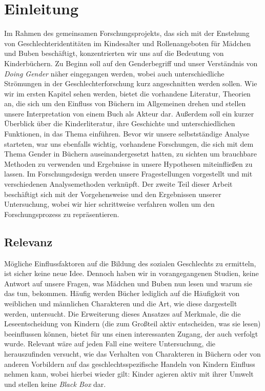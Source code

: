 \onehalfspace

\chapter{Einleitung}

Im Rahmen des gemeinsamen Forschungsprojekts, das sich mit der Enstehung
von Geschlechteridentitäten im Kindesalter und Rollenangeboten für
Mädchen und Buben beschäftigt, konzentrierten wir uns auf die Bedeutung
von Kinderbüchern. Zu Beginn soll auf den Genderbegriff und unser
Verständnis von \emph{Doing Gender} näher eingegangen werden, wobei auch
unterschiedliche Strömungen in der Geschlechterforschung kurz
angeschnitten werden sollen. Wie wir im ersten Kapitel sehen werden,
bietet die vorhandene Literatur, Theorien an, die sich um den Einfluss
von Büchern im Allgemeinen drehen und stellen unsere Interpretation von
einem Buch als Akteur dar. Außerdem soll ein kurzer Überblick über die
Kinderliteratur, ihre Geschichte und unterschiedlichen Funktionen, in
das Thema einführen. Bevor wir unsere selbstständige Analyse starteten,
war uns ebenfalls wichtig, vorhandene Forschungen, die sich mit dem
Thema Gender in Büchern auseinandergesetzt hatten, zu sichten um
brauchbare Methoden zu verwenden und Ergebnisse in unsere Hypothesen
miteinfließen zu lassen. Im Forschungsdesign werden unsere
Fragestellungen vorgestellt und mit verschiedenen Analysemethoden
verknüpft. Der zweite Teil dieser Arbeit beschäftigt sich mit der
Vorgehensweise und den Ergebnissen unserer Untersuchung, wobei wir hier
schrittweise verfahren wollen um den Forschungsprozess zu
repräsentieren.

\section{Relevanz}

Mögliche Einflussfaktoren auf die Bildung des sozialen Geschlechts zu
ermitteln, ist sicher keine neue Idee. Dennoch haben wir in
vorangegangenen Studien, keine Antwort auf unsere Fragen, was Mädchen
und Buben nun lesen und warum sie das tun, bekommen. Häufig werden
Bücher lediglich auf die Häufigkeit von weiblichen und männlichen
Charakteren und die Art, wie diese dargestellt werden, untersucht. Die
Erweiterung dieses Ansatzes auf Merkmale, die die Leseentscheidung von
Kindern (die zum Großteil aktiv entscheiden, was sie lesen) beeinflussen
können, bietet für uns einen interessanten Zugang, der auch verfolgt
wurde. Relevant wäre auf jeden Fall eine weitere Untersuchung, die
herauszufinden versucht, wie das Verhalten von Charakteren in Büchern
oder von anderen Vorbildern auf das geschlechtsspezifische Handeln von
Kindern Einfluss nehmen kann, wobei hierbei wieder gilt: Kinder agieren
aktiv mit ihrer Umwelt und stellen keine \emph{Black Box} dar.
